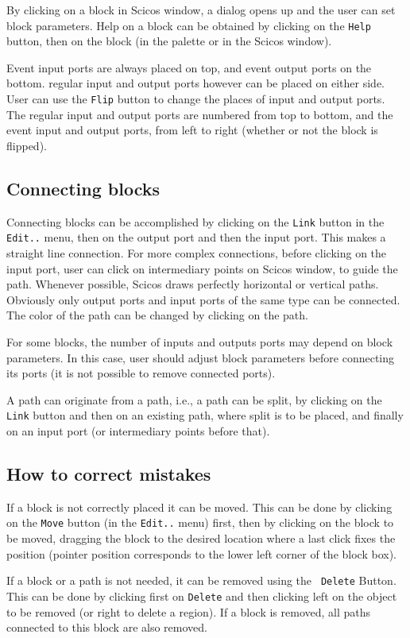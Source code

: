 \documentclass{book}
\begin{document}
By clicking on a block in
Scicos window, a dialog opens up and the user can set block parameters. 
Help on a block can be obtained by clicking on the {\tt Help} button,
then on the block (in the palette or in the Scicos   window).

Event input ports are always placed on top, and event output ports on the
bottom. regular input and output ports however can be placed on either
side. User can use the {\tt Flip} button to change the places of input and
output ports. The regular input and output ports are numbered from top to
bottom, and the event input and output ports, from left to right
(whether or not the block is flipped).

\subsection{Connecting blocks}
Connecting blocks can be accomplished by clicking on the {\tt Link}
button in the {\tt Edit..} menu, then on the output port and then the
input port. This makes a 
straight line connection. For more complex connections, before
clicking on the input port, user can click on intermediary points on
Scicos   window, to guide the path. Whenever possible, Scicos   draws
perfectly horizontal or vertical paths. Obviously only output ports
and input ports of the same type can be connected. The color of the
path can be changed by clicking on the path.

For some blocks, the number of inputs and outputs ports may depend on block
parameters. In this case,
user should adjust block parameters before connecting its ports (it is
not possible to remove connected ports). 

A path can originate from a path, i.e., a path can be split, by clicking
on the {\tt Link} button and then on an existing path, where split is
to be placed, and finally on an input port (or intermediary points
before that). 

\subsection{How to correct mistakes}
If a block is not correctly placed it can be moved. This can be done
by clicking on the {\tt Move} button (in the {\tt Edit..} menu) first,
then by clicking on the block to be moved, dragging the block
to the desired location where a last click fixes the position (pointer
position corresponds to the lower left corner of the block box).

If a block or a path is not needed, it can be removed using the {\tt
Delete} Button. This can be done by clicking first on {\tt Delete}
and then clicking left on the object to be removed (or right to delete
a region). If a block is
removed, all paths connected to this block are also removed. 
\end{document}
